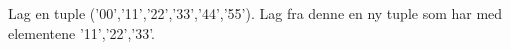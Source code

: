 %
%
Lag en tuple ('00','11','22','33','44','55'). Lag fra denne en ny tuple som har med elementene '11','22','33'.
